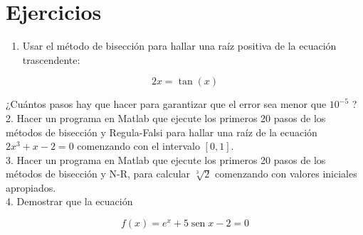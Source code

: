 \documentclass[10pt]{book}
\begin{document}
\section{Ejercicios}
\begin{enumerate}
  \item Usar el método de bisección para hallar una raíz positiva de la ecuación trascendente:
\end{enumerate}

$$
2 x=\tan (x)
$$

¿Cuántos pasos hay que hacer para garantizar que el error sea menor que $10^{-5}$ ?\\
2. Hacer un programa en Matlab que ejecute los primeros 20 pasos de los métodos de bisección y Regula-Falsi para hallar una raíz de la ecuación $2 x^{3}+x-2=0$ comenzando con el intervalo $[0,1]$.\\
3. Hacer un programa en Matlab que ejecute los primeros 20 pasos de los métodos de bisección y N-R, para calcular $\sqrt[3]{2}$ comenzando con valores iniciales apropiados.\\
4. Demostrar que la ecuación

$$
f(x)=e^{x}+5 \operatorname{sen} x-2=0
$$
\end{document}
